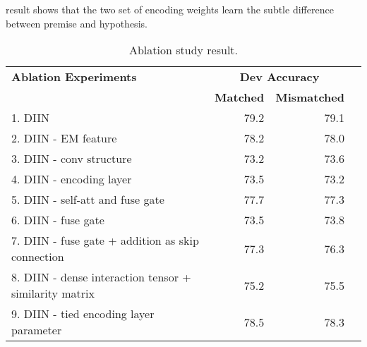 \documentclass{article} \usepackage{iclr2018_conference,times}
\begin{document}
result shows that the two set of encoding weights learn the subtle difference between premise and hypothesis.

\begin{table*}
\centering
\small
\begin{tabular}{l r r r}
\toprule
{\bf Ablation Experiments} & 
\multicolumn{2}{c}{\bf Dev Accuracy} \\

{}    & {\bf Matched} & {\bf Mismatched}\\
\midrule
1. DIIN & 79.2 & 79.1 \\
\midrule
2. DIIN - EM feature & 78.2 & 78.0 \\ 
\midrule
3. DIIN - conv structure & 73.2 & 73.6 \\
4. DIIN - encoding layer & 73.5 & 73.2 \\
5. DIIN - self-att and fuse gate & 77.7 & 77.3 \\
6. DIIN - fuse gate & 73.5 & 73.8 \\
7. DIIN - fuse gate + addition as skip connection & 77.3 & 76.3 \\
8. DIIN - dense interaction tensor + similarity matrix & 75.2  & 75.5 \\
9. DIIN - tied encoding layer parameter & 78.5 & 78.3 \\
\bottomrule
\end{tabular}

\caption{Ablation study result.\label{tab:ablation}}
\end{table*}
\end{document}
